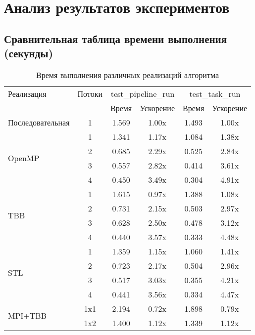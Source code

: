 \documentclass[a4paper,14pt]{extarticle}
\begin{document}
\newpage

\section*{Анализ результатов экспериментов}

\subsection*{Сравнительная таблица времени выполнения (секунды)}

\begin{table}[H] %
    \centering
    \caption{Время выполнения различных реализаций алгоритма}
    \begin{tabular}{lccccc}
        \toprule
            Реализация & Потоки & \multicolumn{2}{c}{test\_pipeline\_run} & \multicolumn{2}{c}{test\_task\_run} \\
            & & Время & Ускорение & Время & Ускорение \\
        \midrule
            \multirow{1}{*}{Последовательная} & 1 & 1.569 & 1.00x & 1.493 & 1.00x \\
        \midrule
            \multirow{4}{*}{OpenMP} & 1 & 1.341 & 1.17x & 1.084 & 1.38x \\
            & 2 & 0.685 & 2.29x & 0.525 & 2.84x \\
            & 3 & 0.557 & 2.82x & 0.414 & 3.61x \\
            & 4 & 0.450 & 3.49x & 0.304 & 4.91x \\
        \midrule
            \multirow{4}{*}{TBB} & 1 & 1.615 & 0.97x & 1.388 & 1.08x \\
            & 2 & 0.731 & 2.15x & 0.503 & 2.97x \\
            & 3 & 0.628 & 2.50x & 0.478 & 3.12x \\
            & 4 & 0.440 & 3.57x & 0.333 & 4.48x \\
        \midrule
            \multirow{4}{*}{STL} & 1 & 1.359 & 1.15x & 1.060 & 1.41x \\
            & 2 & 0.723 & 2.17x & 0.504 & 2.96x \\
            & 3 & 0.517 & 3.03x & 0.355 & 4.21x \\
            & 4 & 0.441 & 3.56x & 0.334 & 4.47x \\
        \midrule
            \multirow{12}{*}{MPI+TBB} & 1x1 & 2.194 & 0.72x & 1.898 & 0.79x \\
            & 1x2 & 1.400 & 1.12x & 1.339 & 1.12x \\

\end{tabular}
\end{table}
\end{document}
